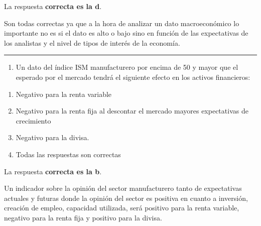 \documentclass[
  letterpaper,
  DIV=11,
  numbers=noendperiod]{scrreprt}
\providecommand{\tightlist}{%
  \setlength{\itemsep}{0pt}\setlength{\parskip}{0pt}}\usepackage{longtable,booktabs,array}
\begin{document}
\begin{tcolorbox}[enhanced jigsaw, left=2mm, opacityback=0, colback=white, breakable, arc=.35mm, bottomrule=.15mm, rightrule=.15mm, toprule=.15mm, leftrule=.75mm, colframe=quarto-callout-tip-color-frame]
\begin{minipage}[t]{5.5mm}
\textcolor{quarto-callout-tip-color}{\faLightbulb}
\end{minipage}%
\begin{minipage}[t]{\textwidth - 5.5mm}

La respuesta \textbf{correcta es la d}.

Son todas correctas ya que a la hora de analizar un dato macroeconómico
lo importante no es si el dato es alto o bajo sino en función de las
expectativas de los analistas y el nivel de tipos de interés de la
economía.

\end{minipage}%
\end{tcolorbox}

\begin{center}\rule{0.5\linewidth}{0.5pt}\end{center}

\begin{enumerate}
\def\labelenumi{\arabic{enumi}.}
\setcounter{enumi}{36}
\tightlist
\item
  Un dato del índice ISM manufacturero por encima de 50 y mayor que el
  esperado por el mercado tendrá el siguiente efecto en los activos
  financieros:
\end{enumerate}

\begin{enumerate}
\def\labelenumi{\alph{enumi})}
\item
  Negativo para la renta variable
\item
  Negativo para la renta fija al descontar el mercado mayores
  expectativas de crecimiento
\item
  Negativo para la divisa.
\item
  Todas las respuestas son correctas
\end{enumerate}

\begin{tcolorbox}[enhanced jigsaw, left=2mm, opacityback=0, colback=white, breakable, arc=.35mm, bottomrule=.15mm, rightrule=.15mm, toprule=.15mm, leftrule=.75mm, colframe=quarto-callout-tip-color-frame]
\begin{minipage}[t]{5.5mm}
\textcolor{quarto-callout-tip-color}{\faLightbulb}
\end{minipage}%
\begin{minipage}[t]{\textwidth - 5.5mm}

La respuesta \textbf{correcta es la b}.

Un indicador sobre la opinión del sector manufacturero tanto de
expectativas actuales y futuras donde la opinión del sector es positiva
en cuanto a inversión, creación de empleo, capacidad utilizada, será
positivo para la renta variable, negativo para la renta fija y positivo
para la divisa.

\end{minipage}%
\end{tcolorbox}
\end{document}

